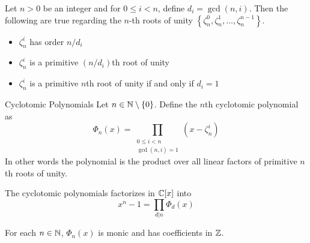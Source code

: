\documentclass[a4paper]{article}
\begin{document}
\begin{lmm}{}{} Let $n>0$ be an integer and for $0\leq i<n$, define $d_i=\gcd(n,i)$. Then the following are true regarding the $n$-th roots of unity $\left\{\zeta_n^0,\zeta_n^1,\dots,\zeta_n^{n-1}\right\}$. 
\begin{itemize}
\item $\zeta_n^i$ has order $n/d_i$
\item $\zeta_n^i$ is a primitive $(n/d_i)$th root of unity
\item $\zeta_n^i$ is a primitive $n$th root of unity if and only if $d_i=1$
\end{itemize}
\end{lmm}

\begin{defn}{Cyclotomic Polynomials}{} Let $n\in\mathbb{N}\setminus\{0\}$. Define the $n$th cyclotomic polynomial as $$\Phi_n(x)=\prod_{\substack{0\leq i<n\\\gcd(n,i)=1}}\left(x-\zeta_n^i\right)$$
In other words the polynomial is the product over all linear factors of primitive $n$th roots of unity. 
\end{defn}

\begin{prp}{}{} The cyclotomic polynomials factorizes in $\mathbb{C}[x]$ into $$x^n-1=\prod_{d|n}\Phi_d(x)$$
\end{prp}

\begin{prp}{}{} For each $n\in\mathbb{N}$, $\Phi_n(x)$ is monic and has coefficients in $\mathbb{Z}$. 
\end{prp}
\end{document}
